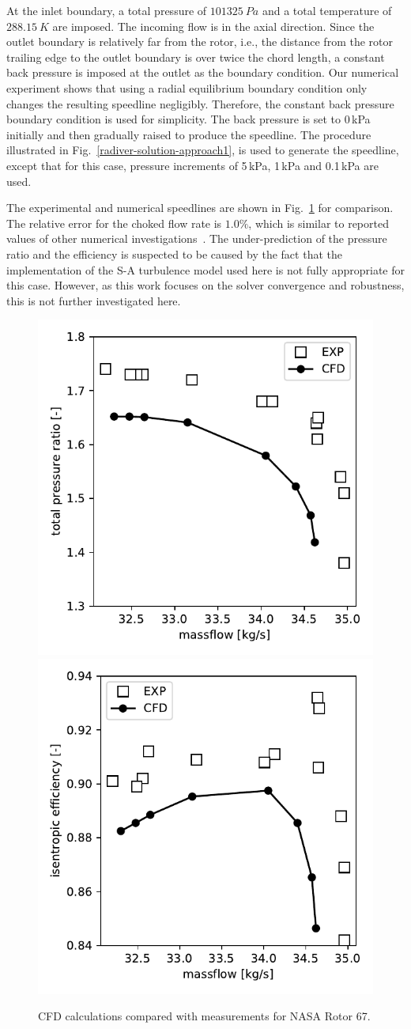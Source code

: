 \documentclass[journal,final]{new-aiaa}
\begin{document}
At the inlet boundary, a total pressure of $101325~Pa$ and
a total temperature of $288.15~K$ are imposed.
The incoming flow is in the axial direction.
Since the outlet boundary is relatively far from the rotor,
i.e., the distance from the rotor trailing edge to the outlet
boundary is over twice the chord length, a constant back
pressure is imposed at the outlet as the boundary condition.
Our numerical experiment shows that using a
radial
equilibrium boundary condition only changes the resulting
speedline negligibly.
Therefore, the constant back pressure
boundary condition is used for simplicity.
The back pressure is set to 0\,kPa initially and
then gradually raised to produce the speedline.
The procedure illustrated in
Fig.~\ref{radiver-solution-approach1},
is used to generate the speedline,
except that for this case, pressure increments of 5\,kPa,
1\,kPa and 0.1\,kPa are used.

The experimental
and numerical speedlines are shown in Fig.~\ref{rotor67-map}
for comparison. The relative error for the choked flow
rate is $1.0\%$, which is similar to reported
values of other numerical investigations~\cite{Arnone1994Viscous}.
The under-prediction of the pressure ratio and the efficiency
is suspected to be caused by the fact that the implementation of
the S-A turbulence model used here is not fully appropriate
for this case.
However,
as this work focuses on the solver convergence and robustness,
this is not further investigated here. 
\begin{figure}[htb]
	\centering   
	\includegraphics[width=0.3 \textwidth]{rotor67/conv/rotor67-pr.pdf}
	\hspace{.1\textwidth}
	\includegraphics[width=0.3 \textwidth]{rotor67/conv/rotor67-eff.pdf}
	\caption{CFD calculations compared with measurements \cite{Strazisar1989Laser} 
		for NASA Rotor 67.}
	\label{rotor67-map} 
\end{figure}
\end{document}
